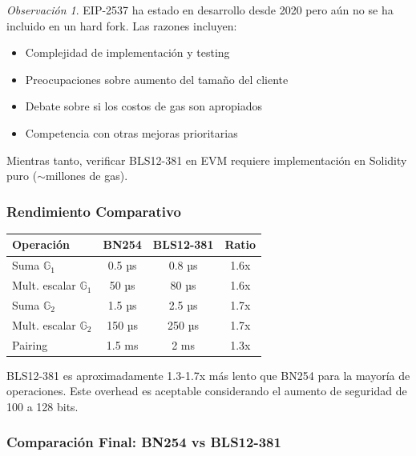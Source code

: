 \documentclass[11pt,a4paper,twoside,openright]{book}
\theoremstyle{definition}
\theoremstyle{plain}
\theoremstyle{remark}
\newtheorem{remark}{Observación}[chapter]
\newcommand{\G}{\mathbb{G}}
\begin{document}
\begin{remark}
EIP-2537 ha estado en desarrollo desde 2020 pero aún no se ha incluido en un hard fork. Las razones incluyen:
\begin{itemize}
    \item Complejidad de implementación y testing
    \item Preocupaciones sobre aumento del tamaño del cliente
    \item Debate sobre si los costos de gas son apropiados
    \item Competencia con otras mejoras prioritarias
\end{itemize}

Mientras tanto, verificar BLS12-381 en EVM requiere implementación en Solidity puro ($\sim$millones de gas).
\end{remark}

\subsubsection{Rendimiento Comparativo}

\begin{center}
\begin{tabular}{lccc}
\toprule
\textbf{Operación} & \textbf{BN254} & \textbf{BLS12-381} & \textbf{Ratio} \\
\midrule
Suma $\G_1$ & 0.5 µs & 0.8 µs & 1.6x \\
Mult. escalar $\G_1$ & 50 µs & 80 µs & 1.6x \\
Suma $\G_2$ & 1.5 µs & 2.5 µs & 1.7x \\
Mult. escalar $\G_2$ & 150 µs & 250 µs & 1.7x \\
Pairing & 1.5 ms & 2 ms & 1.3x \\
\bottomrule
\end{tabular}
\end{center}

\begin{intuicion}
BLS12-381 es aproximadamente 1.3-1.7x más lento que BN254 para la mayoría de operaciones. Este overhead es aceptable considerando el aumento de seguridad de 100 a 128 bits.
\end{intuicion}

\subsubsection{Comparación Final: BN254 vs BLS12-381}
\end{document}
